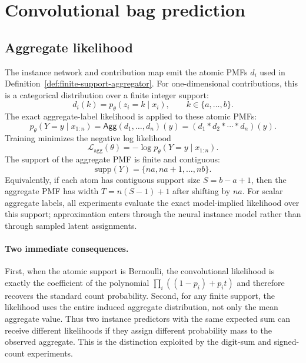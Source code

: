 \section{Convolutional bag prediction}
\label{sec:convolutional-bag-prediction}

\subsection{Aggregate likelihood}

The instance network and contribution map emit the atomic PMFs $d_i$ used in Definition~\ref{def:finite-support-aggregator}.
For one-dimensional contributions, this is a categorical distribution over a finite integer support:
\begin{equation}
  d_i(k) = p_\theta(z_i = k \mid x_i), \qquad k \in \{a,\ldots,b\}.
\end{equation}
The exact aggregate-label likelihood is \method{} applied to these atomic PMFs:
\begin{equation}
  p_\theta(Y=y \mid x_{1:n})
  =
  \mathsf{Agg}(d_1,\ldots,d_n)(y)
  =
  \left(d_1 * d_2 * \cdots * d_n\right)(y).
\end{equation}
Training minimizes the negative log likelihood
\begin{equation}
  \mathcal{L}_{\mathrm{agg}}(\theta)
  =
  -\log p_\theta(Y=y \mid x_{1:n}).
\end{equation}
The support of the aggregate PMF is finite and contiguous:
\begin{equation}
  \mathrm{supp}(Y) = \{na, na+1,\ldots, nb\}.
\end{equation}
Equivalently, if each atom has contiguous support size $S=b-a+1$, then the aggregate PMF has width $T=n(S-1)+1$ after shifting by $na$.
For scalar aggregate labels, all experiments evaluate the exact model-implied likelihood over this support; approximation enters through the neural instance model rather than through sampled latent assignments.

\paragraph{Two immediate consequences.}
First, when the atomic support is Bernoulli, the convolutional likelihood is exactly the coefficient of the polynomial $\prod_i((1-p_i)+p_it)$ and therefore recovers the standard count probability.
Second, for any finite support, the likelihood uses the entire induced aggregate distribution, not only the mean aggregate value.
Thus two instance predictors with the same expected sum can receive different likelihoods if they assign different probability mass to the observed aggregate.
This is the distinction exploited by the digit-sum and signed-count experiments.


